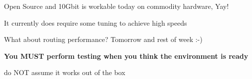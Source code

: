 \documentclass[20pt,landscape,a4paper,footrule]{foils}
\begin{document}


\begin{list1}
\item Open Source and 10Gbit is workable today on commodity hardware, Yay!
\item It currently does require some tuning to achieve high speeds
\item What about routing performance? Tomorrow and rest of week :-)
\end{list1}

{\bf You MUST perform testing when you think the environment is ready
\vskip 2cm
\centerline{\Large do NOT assume it works out of the box}}
\end{document}

